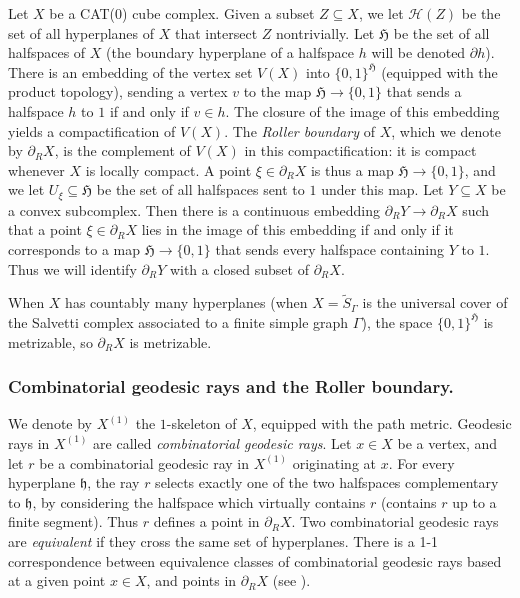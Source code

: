 \documentclass[JEP,XML,SOM,Unicode,NoFloatCountersInSection,published]{cedram}
\let\mathcal\mathscr
\theoremstyle{plain}
\theoremstyle{definition}
\newcommand{\calh}{\mathcal{H}}
\begin{document}
Let $X$ be a CAT(0) cube complex. Given a subset $Z\subseteq X$, we let $\calh(Z)$ be the set of all hyperplanes of $X$ that intersect $Z$ nontrivially. Let $\mathfrak{H}$ be the set of all halfspaces of $X$ (the boundary hyperplane of a halfspace $h$ will be denoted $\partial h$). There is an embedding of the vertex set $V(X)$ into $\{0,1\}^{\mathfrak{H}}$ (equipped with the product topology), sending a vertex $v$ to the map $\mathfrak{H}\to\{0,1\}$ that sends a halfspace $h$ to $1$ if and only if $v\in h$. The closure of the image of this embedding yields a compactification of $V(X)$. The \emph{Roller boundary} of $X$, which we denote by $\partial_RX$, is the complement of $V(X)$ in this compactification: it is compact whenever $X$ is locally compact. A point $\xi\in\partial_R X$ is thus a map $\mathfrak{H}\to\{0,1\}$, and we let $U_\xi\subseteq\mathfrak{H}$ be the set of all halfspaces sent to $1$ under this map. Let $Y\subseteq X$ be a convex subcomplex. Then there is a continuous embedding $\partial_RY\to \partial_R X$ such that a point $\xi\in\partial_R X$ lies in the image of this embedding if and only if it corresponds to a map $\mathfrak{H}\to\{0,1\}$ that sends every halfspace containing $Y$ to $1$. Thus we will identify $\partial_R Y$ with a closed subset of $\partial_R X$.

When $X$ has countably many hyperplanes (\eg when $X=\widetilde{S}_\Gamma$ is the universal cover of the Salvetti complex associated to a finite simple graph $\Gamma$), the space $\{0,1\}^{\mathfrak{H}}$ is metrizable, so $\partial_RX$ is metrizable.

\subsubsection*{Combinatorial geodesic rays and the Roller boundary.} We denote by $X^{(1)}$ the $1$\nobreakdash-skele\-ton of $X$, equipped with the path metric. Geodesic rays in $X^{(1)}$ are called \emph{combinatorial geodesic rays}. Let $x\in X$ be a vertex, and let $r$ be a combinatorial geodesic ray in $X^{(1)}$ originating at $x$. For every hyperplane $\mathfrak{h}$, the ray $r$ selects exactly one of the two halfspaces complementary to $\mathfrak{h}$, by considering the halfspace which virtually contains $r$ (\ie contains $r$ up to a finite segment). Thus $r$ defines a point in $\partial_R X$. Two combinatorial geodesic rays are \emph{equivalent} if they cross the same set of hyperplanes. There is a 1-1 correspondence between equivalence classes of combinatorial geodesic rays based at a given point $x\in X$, and points in $\partial_R X$ (see \eg \cite[\S A.2]{genevois2020contracting}).
\end{document}
